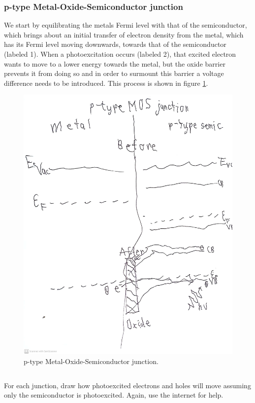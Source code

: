 \documentclass[12pt]{article}
\begin{document}
\subsubsection{p-type Metal-Oxide-Semiconductor junction}
We start by equilibrating the metals Fermi level with that of the semiconductor, which brings about an initial transfer of electron density from the metal, which has its Fermi level moving downwards, towards that of the semiconductor (labeled 1). When a photoexcitation occurs (labeled 2), that excited electron wants to move to a lower energy towards the metal, but the oxide barrier prevents it from doing so and in order to surmount this barrier a voltage difference needs to be introduced. This process is shown in figure \ref{fig:mos}.
\begin{figure}[h]
\centering
\includegraphics[width=\textwidth]{mos.jpg}
\caption{p-type Metal-Oxide-Semiconductor junction.}
\label{fig:mos}
\end{figure}
\subsection{}
For each junction, draw how photoexcited electrons and holes will move assuming only the semiconductor is photoexcited. Again, use the internet for help.\\
\end{document}
